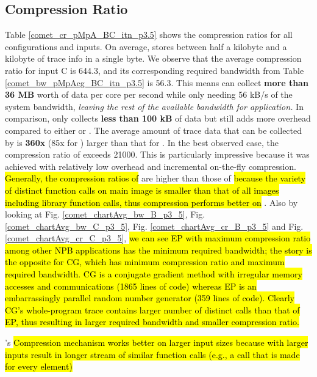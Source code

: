 \subsection{Compression Ratio}
\label{subsec:cr}
Table \ref{comet_cr_pMpA_BC_itn_p3.5} shows the compression ratios for all configurations and inputs.
%
On average, \parlot stores between half a kilobyte and a kilobyte of trace info in a single byte. 
%
We observe that the
average compression ratio for \parlota input C is 644.3, and its
corresponding required bandwidth from Table
\ref{comet_bw_pMpAcg_BC_itn_p3.5} is 56.3.
%
This means \parlot can
collect \textbf{more than 36 MB} worth of data per core per second
while only needing 56 kB/s of the system bandwidth, {\em leaving the rest of the available bandwidth for application.}
%
In comparison, \callgrind only
collects \textbf{less than 100 kB} of data but still adds more
overhead compared to either \parlota or \parlotm . 
%
The average amount of trace data that can be collected by \parlota is
\textbf{360x} (85x for \parlotm) larger than that for \callgrind.
%
In the best observed case, the compression ratio of
\parlot exceeds 21000.
%
This is particularly impressive because it was achieved with relatively low overhead and incremental  
on-the-fly compression.
%
\hl{Generally, the compression ratios of} \parlotm are higher than those of \parlota \hl{ because the variety of distinct function calls on main image is smaller than that of all images including library function calls, thus compression performs better on} \parlotm. 
Also by looking at Fig. \ref{comet_chartAvg_bw_B_p3_5}, Fig. \ref{comet_chartAvg_bw_C_p3_5}, Fig. \ref{comet_chartAvg_cr_B_p3_5} and Fig. \ref{comet_chartAvg_cr_C_p3_5},\hl{ we can see EP with maximum compression ratio among other NPB applications has the minimum required bandwidth; the story is the opposite for CG, which has minimum compression ratio and maximum required bandwidth. CG is a conjugate gradient method with irregular memory accesses and communications (1865 lines of code) whereas EP is an embarrassingly parallel random number generator (359 lines of code). Clearly CG's whole-program trace contains larger number of distinct calls than that of EP, thus resulting in larger required bandwidth and smaller compression ratio.}
%

\parlot's \hl{Compression mechanism works better on larger input sizes because with larger inputs result in longer stream of similar function calls (e.g., a call that is made for every element)}
  


